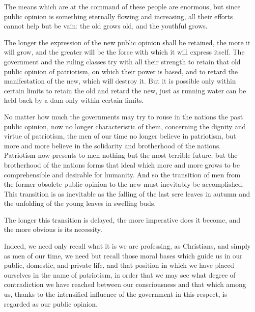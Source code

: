 \documentclass{book}
\begin{document}
The means which are at the command of these people are enormous, but since public opinion is something eternally flowing and increasing, all their efforts cannot help but be vain: the old grows old, and the youthful grows.

The longer the expression of the new public opinion shall be retained, the more it will grow, and the greater will be the force with which it will express itself. The government and the ruling classes try with all their strength to retain that old public opinion of patriotism, on which their power is based, and to retard the manifestation of the new, which will destroy it. But it is possible only within certain limits to retain the old and retard the new, just as running water can be held back by a dam only within certain limits.

No matter how much the governments may try to rouse in the nations the past public opinion, now no longer characteristic of them, concerning the dignity and virtue of patriotism, the men of our time no longer believe in patriotism, but more and more believe in the solidarity and brotherhood of the nations. Patriotism now presents to men nothing but the most terrible future; but the brotherhood of the nations forms that ideal which more and more grows to be comprehensible and desirable for humanity. And so the transition of men from the former obsolete public opinion to the new must inevitably be accomplished. This transition is as inevitable as the falling of the last sere leaves in autumn and the unfolding of the young leaves in swelling buds.

The longer this transition is delayed, the more imperative does it become, and the more obvious is its necessity.

Indeed, we need only recall what it is we are professing, as Christians, and simply as men of our time, we need but recall those moral bases which guide us in our public, domestic, and private life, and that position in which we have placed ourselves in the name of patriotism, in order that we may see what degree of contradiction we have reached between our consciousness and that which among us, thanks to the intensified influence of the government in this respect, is regarded as our public opinion.
\end{document}
